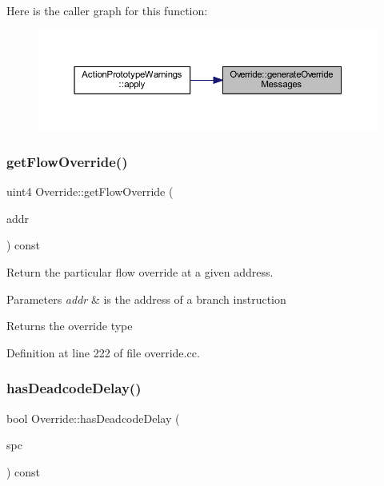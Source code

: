 Here is the caller graph for this function\+:
\nopagebreak
\begin{figure}[H]
\begin{center}
\leavevmode
\includegraphics[width=350pt]{class_override_a6d27df21e6a0448729260d0179d35500_icgraph}
\end{center}
\end{figure}
\mbox{\label{class_override_ab15cf0bc049c1faf14ad8ddbba898821}} 
\subsubsection{\texorpdfstring{getFlowOverride()}{getFlowOverride()}}
{\footnotesize\ttfamily uint4 Override\+::get\+Flow\+Override (\begin{DoxyParamCaption}\item[{const \mbox{\hyperlink{class_address}{Address}} \&}]{addr }\end{DoxyParamCaption}) const}



Return the particular flow override at a given address. 


\begin{DoxyParams}{Parameters}
{\em addr} & is the address of a branch instruction \\
\hline
\end{DoxyParams}
\begin{DoxyReturn}{Returns}
the override type 
\end{DoxyReturn}


Definition at line 222 of file override.\+cc.

\mbox{\label{class_override_a3845c19e46f983d2034e06bb1980b672}} 
\subsubsection{\texorpdfstring{hasDeadcodeDelay()}{hasDeadcodeDelay()}}
{\footnotesize\ttfamily bool Override\+::has\+Deadcode\+Delay (\begin{DoxyParamCaption}\item[{\mbox{\hyperlink{class_addr_space}{Addr\+Space}} $\ast$}]{spc }\end{DoxyParamCaption}) const}



